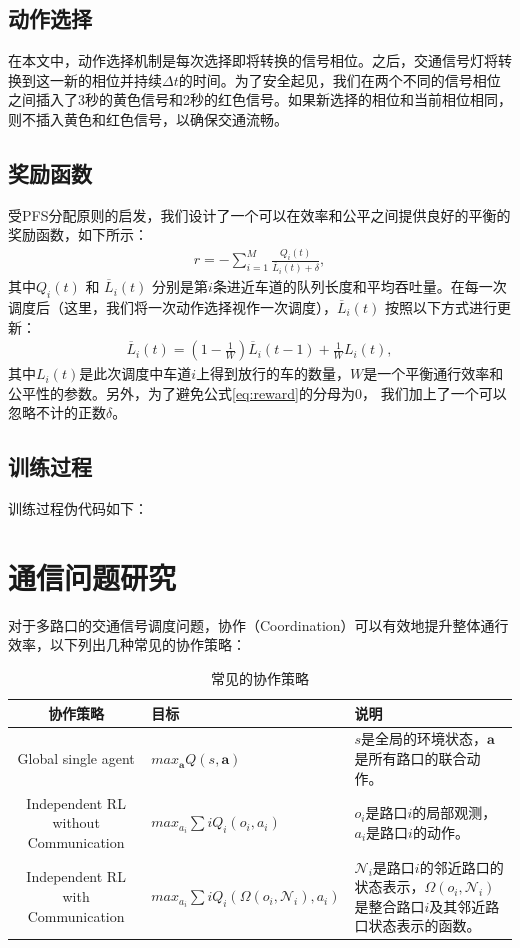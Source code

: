 \subsection*{动作选择}
在本文中，动作选择机制是每次选择即将转换的信号相位。之后，交通信号灯将转换到这一新的相位并持续$\Delta t$的时间。为了安全起见，我们在两个不同的信号相位之间插入了3秒的黄色信号和2秒的红色信号。如果新选择的相位和当前相位相同，则不插入黄色和红色信号，以确保交通流畅。
\subsection*{奖励函数}
受PFS分配原则的启发，我们设计了一个可以在效率和公平之间提供良好的平衡的奖励函数，如下所示：
\begin{align}
\label{eq:reward}
    r = -\sum_{i=1}^{M} \frac{Q_i(t)}{\overline{L}_i(t) + \delta},
\end{align}
其中$Q_i(t)$ 和 $\overline{L}_i(t)$ 分别是第$i$条进近车道的队列长度和平均吞吐量。在每一次调度后（这里，我们将一次动作选择视作一次调度），$\overline{L}_i(t)$ 按照以下方式进行更新：
\begin{align}
    \overline{L}_i(t) = (1-\frac{1}{W})\overline{L}_i(t-1) + \frac{1}{W}L_i(t),
\end{align}
其中$L_i(t)$是此次调度中车道$i$上得到放行的车的数量，$W$是一个平衡通行效率和公平性的参数。另外，为了避免公式\ref{eq:reward}的分母为0， 我们加上了一个可以忽略不计的正数$\delta$。
\subsection*{训练过程}
训练过程伪代码如下：

\section{通信问题研究}
对于多路口的交通信号调度问题，协作（Coordination）可以有效地提升整体通行效率，以下列出几种常见的协作策略：
\begin{table}[htb]
    \caption[协作策略]{常见的协作策略\label{tab:coordination}}
    \begin{tabular}{clp{}}
      \toprule
      协作策略 & 目标 & 说明 \\
      \midrule
      Global single agent & $max_{\mathbf{a}}Q(s, \mathbf{a})$ & $s$是全局的环境状态，$\mathbf{a}$是所有路口的联合动作。\\
      Independent RL without Communication & $max_{a_{i}}\sum{i}Q_{i}(o_i, a_i)$ & $o_i$是路口$i$的局部观测，$a_i$是路口$i$的动作。\\
      Independent RL with Communication & $max_{a_i}\sum{i}Q_i(\Omega(o_i, \mathcal{N}_i), a_i)$ &$\mathcal{N}_i$是路口$i$的邻近路口的状态表示，$\Omega(o_i, \mathcal{N}_i)$是整合路口$i$及其邻近路口状态表示的函数。\\
      \bottomrule
    \end{tabular}
\end{table}


